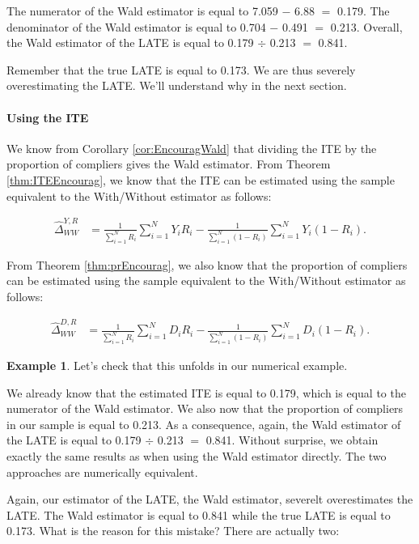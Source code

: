 \documentclass[
]{book}
\theoremstyle{definition}
\theoremstyle{definition}
\newtheorem{example}{Example}[chapter]
\theoremstyle{definition}
\theoremstyle{definition}
\theoremstyle{remark}
\begin{document}
The numerator of the Wald estimator is equal to 7.059 \(-\) 6.88 \(=\) 0.179.
The denominator of the Wald estimator is equal to 0.704 \(-\) 0.491 \(=\) 0.213.
Overall, the Wald estimator of the LATE is equal to 0.179 \(\div\) 0.213 \(=\) 0.841.

Remember that the true LATE is equal to 0.173.
We are thus severely overestimating the LATE.
We'll understand why in the next section.

\hypertarget{using-the-ite}{%
\paragraph{Using the ITE}\label{using-the-ite}}

We know from Corollary \ref{cor:EncouragWald} that dividing the ITE by the proportion of compliers gives the Wald estimator.
From Theorem \ref{thm:ITEEncourag}, we know that the ITE can be estimated using the sample equivalent to the With/Without estimator as follows:

\begin{align*}
\hat{\Delta}^{Y,R}_{WW} & = \frac{1}{\sum_{i=1}^N R_i}\sum_{i=1}^N Y_iR_i-\frac{1}{\sum_{i=1}^N (1-R_i)}\sum_{i=1}^N Y_i(1-R_i).
\end{align*}

From Theorem \ref{thm:prEncourag}, we also know that the proportion of compliers can be estimated using the sample equivalent to the With/Without estimator as follows:

\begin{align*}
\hat{\Delta}^{D,R}_{WW} & = \frac{1}{\sum_{i=1}^N R_i}\sum_{i=1}^N D_iR_i-\frac{1}{\sum_{i=1}^N (1-R_i)}\sum_{i=1}^N D_i(1-R_i).
\end{align*}

\begin{example}
\protect\hypertarget{exm:unnamed-chunk-122}{}{\label{exm:unnamed-chunk-122} }Let's check that this unfolds in our numerical example.
\end{example}
We already know that the estimated ITE is equal to 0.179, which is equal to the numerator of the Wald estimator.
We also now that the proportion of compliers in our sample is equal to 0.213.
As a consequence, again, the Wald estimator of the LATE is equal to 0.179 \(\div\) 0.213 \(=\) 0.841.
Without surprise, we obtain exactly the same results as when using the Wald estimator directly.
The two approaches are numerically equivalent.

Again, our estimator of the LATE, the Wald estimator, severelt overestimates the LATE.
The Wald estimator is equal to 0.841 while the true LATE is equal to 0.173.
What is the reason for this mistake?
There are actually two:
\end{document}
